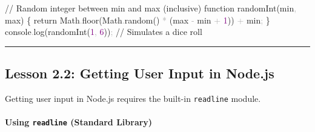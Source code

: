 \documentclass[
  justified,
  openright,
]{tufte-book}
\let\subsubsection\paragraph
\let\paragraph\paragraph
\newcommand{\AttributeTok}[1]{\textcolor{DarkSlateGray}{#1}}
\newcommand{\BuiltInTok}[1]{#1}
\newcommand{\CommentTok}[1]{\textcolor{MidGray}{#1}}
\newcommand{\ControlFlowTok}[1]{\textcolor{BrandBlue}{#1}}
\newcommand{\DataTypeTok}[1]{\textcolor{Purple}{#1}}
\newcommand{\DecValTok}[1]{\textcolor{Purple}{#1}}
\newcommand{\FunctionTok}[1]{\textcolor{BrandBlue}{#1}}
\newcommand{\KeywordTok}[1]{\textcolor{BrandBlue}{#1}}
\newcommand{\NormalTok}[1]{#1}
\newcommand{\OperatorTok}[1]{\textcolor{DarkGray}{#1}}
\newcommand{\PreprocessorTok}[1]{\textcolor{BrandAccent}{#1}}
\newcommand{\SpecialCharTok}[1]{\textcolor{Teal}{#1}}
\newcommand{\StringTok}[1]{\textcolor{Teal}{#1}}
\newcommand{\VerbatimStringTok}[1]{\textcolor{Teal}{#1}}
\newenvironment{Shaded}{%
  \begin{snugshade}
}{%
  \end{snugshade}
}
\let\subsubsection\paragraph
\let\paragraph\paragraph
\begin{document}
\begin{Shaded}
\begin{Highlighting}[]
\CommentTok{// Random integer between min and max (inclusive)}
\KeywordTok{function} \FunctionTok{randomInt}\NormalTok{(min}\OperatorTok{,}\NormalTok{ max) \{}
  \ControlFlowTok{return} \BuiltInTok{Math}\OperatorTok{.}\FunctionTok{floor}\NormalTok{(}\BuiltInTok{Math}\OperatorTok{.}\FunctionTok{random}\NormalTok{() }\OperatorTok{*}\NormalTok{ (max }\OperatorTok{{-}}\NormalTok{ min }\OperatorTok{+} \DecValTok{1}\NormalTok{)) }\OperatorTok{+}\NormalTok{ min}\OperatorTok{;}
\NormalTok{\}}
\BuiltInTok{console}\OperatorTok{.}\FunctionTok{log}\NormalTok{(}\FunctionTok{randomInt}\NormalTok{(}\DecValTok{1}\OperatorTok{,} \DecValTok{6}\NormalTok{))}\OperatorTok{;} \CommentTok{// Simulates a dice roll}
\end{Highlighting}
\end{Shaded}

\begin{center}\rule{0.5\linewidth}{0.5pt}\end{center}

\subsection{Lesson 2.2: Getting User Input in
Node.js}\label{lesson-2.2-getting-user-input-in-node.js}

Getting user input in Node.js requires the built-in \texttt{readline}
module.

\subsubsection{\texorpdfstring{Using \texttt{readline} (Standard
Library)}{Using readline (Standard Library)}}\label{using-readline-standard-library}

\begin{Shaded}
\end{Shaded}
\end{document}
